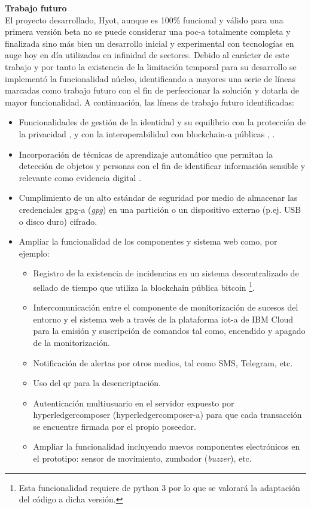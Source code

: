 \documentclass[12pt,a4paper, twoside]{report}
\begin{document}
	{\Large\textbf{Trabajo futuro}} \\
	
	El proyecto desarrollado, Hyot, aunque es 100\% funcional y válido para una primera versión beta no se puede considerar una \gls{poc-a} totalmente completa y finalizada sino más bien un desarrollo inicial y experimental con tecnologías en auge hoy en día utilizadas en infinidad de sectores. Debido al carácter de este trabajo y por tanto la existencia de la limitación temporal para su desarrollo se implementó la funcionalidad núcleo, identificando a mayores una serie de líneas marcadas como trabajo futuro con el fin de perfeccionar la solución y dotarla de mayor funcionalidad. A continuación, las líneas de trabajo futuro identificadas:
	
	\begin{itemize}
		\item Funcionalidades de gestión de la identidad y su equilibrio con la protección de la privacidad \cite{identitymixer}, \cite{jira:IM:FAB-2005} y con la interoperabilidad con \gls{blockchain-a} públicas \cite{hyperledgersawtooth:url}, \cite{ronghua:2018:BCAC}.
		\item Incorporación de técnicas de aprendizaje automático que permitan la detección de objetos y personas con el fin de identificar información sensible y relevante como evidencia digital \cite{ramachandran:2018:SP}.
		\item Cumplimiento de un alto estándar de seguridad por medio de almacenar las credenciales \gls{gpg-a} (\textit{\gls{gpg}}) en una partición o un dispositivo externo (p.ej. USB o disco duro) cifrado.
		\item Ampliar la funcionalidad de los componentes y sistema web como, por ejemplo: 
		
			\begin{itemize}
				\item Registro de la existencia de incidencias en un sistema descentralizado de sellado de tiempo que utiliza la \Gls{blockchain} pública \gls{bitcoin} \cite{opentimestamps}\footnote{Esta funcionalidad requiere de \gls{python} 3 por lo que se valorará la adaptación del código a dicha versión.}.
				\item Intercomunicación entre el componente de monitorización de sucesos del entorno y el sistema web a través de la plataforma \gls{iot-a} de IBM Cloud para la emisión y suscripción de comandos tal como, encendido y apagado de la monitorización.
				\item Notificación de alertas por otros medios, tal como SMS, Telegram, etc.
				\item Uso del \gls{qr} para la desencriptación.
				\item Autenticación multiusuario en el servidor expuesto por \gls{hyperledgercomposer} (\gls{hyperledgercomposer-a}) para que cada transacción se encuentre firmada por el propio poseedor.
				\item Ampliar la funcionalidad incluyendo nuevos componentes electrónicos en el \gls{prototipo}: sensor de movimiento, zumbador (\textit{buzzer}), etc.
			\end{itemize}
	\end{itemize} 
			
\end{document}
